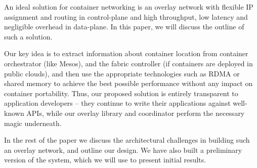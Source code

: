 An ideal solution for container networking is an overlay network with flexible
IP assignment and routing in control-plane and high throughput, low latency and
negligible overhead in data-plane. In this paper, we will discuss the outline of
such a solution. 

Our key idea is to extract information about container location from container
orchestrator (like Mesos), and the fabric controller (if containers are deployed
in public clouds), and then use the appropriate technologies such as RDMA or
shared memory to achieve the best possible performance without any impact
on container portability. Thus, our proposed solution is entirely transparent to
application developers -- they continue to write their applications against
well-known APIs, while our overlay library and coordinator perform the necessary
magic underneath.

In the rest of the paper we discuss the architectural challenges in building
such an overlay network, and outline our design. We have also built a preliminary
version of the system, which we will use to present initial results.
